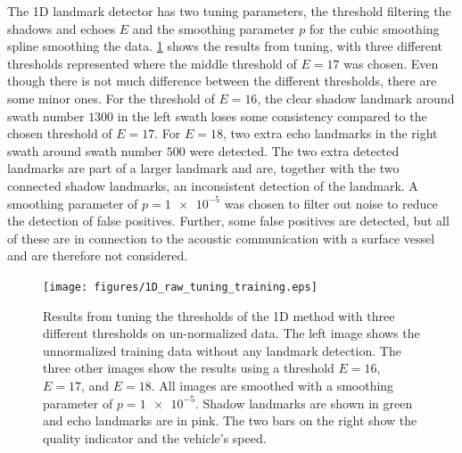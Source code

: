 The 1D landmark detector has two tuning parameters, the threshold filtering the shadows and echoes $E$ and the smoothing parameter $p$ for the cubic smoothing spline smoothing the data. \cref{fig:1D_raw_tuning_training} shows the results from tuning, with three different thresholds represented where the middle threshold of $E = 17$ was chosen. Even though there is not much difference between the different thresholds, there are some minor ones. For the threshold of $E = 16$, the clear shadow landmark around swath number $1300$ in the left swath loses some consistency compared to the chosen threshold of $E = 17$. For $E = 18$, two extra echo landmarks in the right swath around swath number $500$ were detected. The two extra detected landmarks are part of a larger landmark and are, together with the two connected shadow landmarks, an inconsistent detection of the landmark. A smoothing parameter of $p = \num{1e-5}$ was chosen to filter out noise to reduce the detection of false positives. Further, some false positives are detected, but all of these are in connection to the acoustic communication with a surface vessel and are therefore not considered. 

\begin{figure}   %
  \centering
  \texttt{[image: figures/1D\_raw\_tuning\_training.eps]}
  \caption[Results of tuning threshold of the 1D method]{Results from tuning the thresholds of the 1D method with three different thresholds on un-normalized data. The left image shows the unnormalized training data without any landmark detection. The three other images show the results using a threshold $E = 16$, $E = 17$, and $E = 18$. All images are smoothed with a smoothing parameter of $p = \num{1e-5}$. Shadow landmarks are shown in green and echo landmarks are in pink. The two bars on the right show the quality indicator and the vehicle's speed.}
  \label{fig:1D_raw_tuning_training}
\end{figure}

